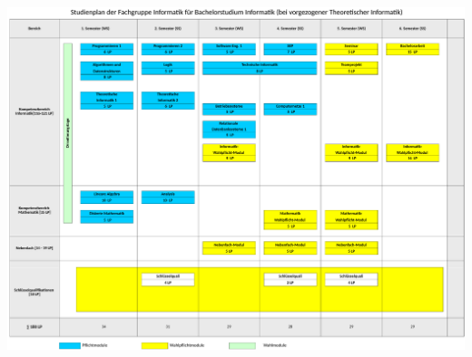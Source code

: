 \begin{minipage}[H]{1.0\linewidth}
\begin{center} 
		\includegraphics[angle=90, totalheight=\textheight, width=\textwidth ]{bilder/studienplan_bsc_ws/ws2015/BScInformatikWS1516-fginfo-theo_scissored}
		\label{studienplan_theo}
\end{center}
\end{minipage}